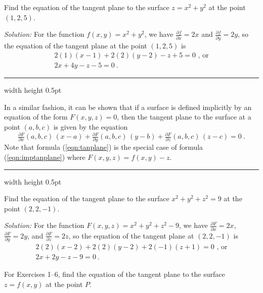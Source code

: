 \begin{exmp}
 Find the equation of the tangent plane to the surface $z =  x^2 + y^2$ at the point $(1,2,5)$.\smallskip
 \par\noindent \emph{Solution:} For the function $f(x,y) = x^2 + y^2$, we have
 $\tfrac{\partial f}{\partial x} = 2x$ and $\tfrac{\partial f}{\partial y} = 2y$, so the equation of the tangent plane
 at the point $(1,2,5)$ is
 \begin{gather*}
  2(1)(x-1)+2(2)(y-2)-z+5=0 \text{~,~or}\\
  2x+4y-z-5=0 ~.
 \end{gather*}
\end{exmp}
\hrule width \textwidth height 0.5pt
\medskip

In a similar fashion, it can be shown that if a surface is defined implicitly by an equation of the form
$F(x,y,z)=0$, then the tangent plane to the surface at a point $(a,b,c)$ is given by the equation
\begin{equation}\label{eqn:imptanplane}
 \tfrac{\partial F}{\partial x}(a,b,c)\,(x-a) + \tfrac{\partial F}{\partial y}(a,b,c)\,(y-b) +
 \tfrac{\partial F}{\partial z}(a,b,c)\,(z-c) = 0 ~.
\end{equation}
Note that formula (\ref{eqn:tanplane}) is the special case of formula (\ref{eqn:imptanplane}) where
$F(x,y,z) = f(x,y) - z$.
\medskip
\hrule width \textwidth height 0.5pt
\begin{exmp}
 Find the equation of the tangent plane to the surface $x^2 + y^2 + z^2 = 9$ at the point $(2,2,-1)$.\smallskip
 \par\noindent \emph{Solution:} For the function $F(x,y,z) = x^2 + y^2 + z^2 - 9$, we have
 $\tfrac{\partial F}{\partial x} = 2x$, $\tfrac{\partial F}{\partial y} = 2y$, and
 $\tfrac{\partial F}{\partial z} = 2z$, so the equation of the tangent plane at $(2,2,-1)$ is
 \begin{gather*}
  2(2)(x-2)+2(2)(y-2)+2(-1)(z+1)=0 \text{~,~or}\\
  2x+2y-z-9=0 ~.
 \end{gather*}
\end{exmp}
\startexercises\label{sec2dot3}
\par\noindent For Exercises 1--6, find the equation of the tangent plane to the surface $z=f(x,y)$ at the point
$P$.
